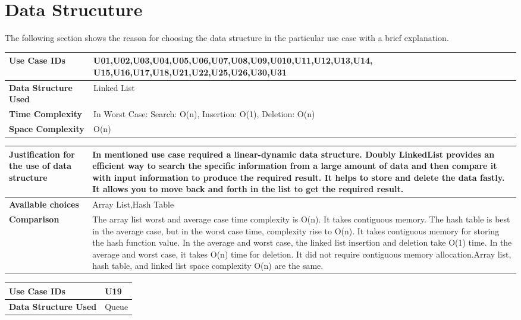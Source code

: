 \documentclass[12pt,a4paper]{report}
\begin{document}
\chapter*{Data Strucuture}
The following section shows the reason for choosing the data structure in the particular use case with a brief explanation.
\begin{center}
\begin{tabular}{ | m{4cm}|m{12cm}| }\hline
\textbf{Use Case IDs}& U01,U02,U03,U04,U05,U06,U07,U08,U09,U010,U11,U12,U13,U14,
U15,U16,U17,U18,U21,U22,U25,U26,U30,U31 \\ \hline
\textbf{Data Structure Used}& Linked List \\ \hline

\textbf{Time Complexity}& 
In Worst Case: Search: O(n), Insertion: O(1), Deletion: O(n)\\\hline
\textbf{Space Complexity}& O(n)\\\hline
 \end{tabular}
 
\begin{tabular}{ | m{4cm}|m{12cm}| }\hline
\textbf{Justification for the use of data structure}&
In mentioned use case required a linear-dynamic data structure. 
Doubly LinkedList provides an efficient way to search the specific information from a large amount of data and then compare it with input information to produce the required result. It helps to store and delete the data fastly. It allows you to move back and forth in the list to get the required result.
 
 \\ \hline
\textbf{Available choices}& Array List,Hash Table \\ \hline
\textbf{Comparison}&
The array list worst and average case time complexity is O(n). It takes contiguous memory. The hash table is best in the average case, but in the worst case time, complexity rise to O(n). It takes contiguous memory for storing the hash function value. In the average and worst case, the linked list insertion and deletion take O(1) time. In the average and worst case, it takes O(n) time for deletion. It did not require contiguous memory allocation.Array list, hash table, and linked list space complexity O(n) are the same.
 \\ \hline
\end{tabular} 

\begin{tabular}{ | m{4cm}|m{12cm}| }\hline
\textbf{Use Case IDs}& U19 \\ \hline
\textbf{Data Structure Used}& Queue \\ \hline


\end{tabular}
\end{center}
\end{document}
